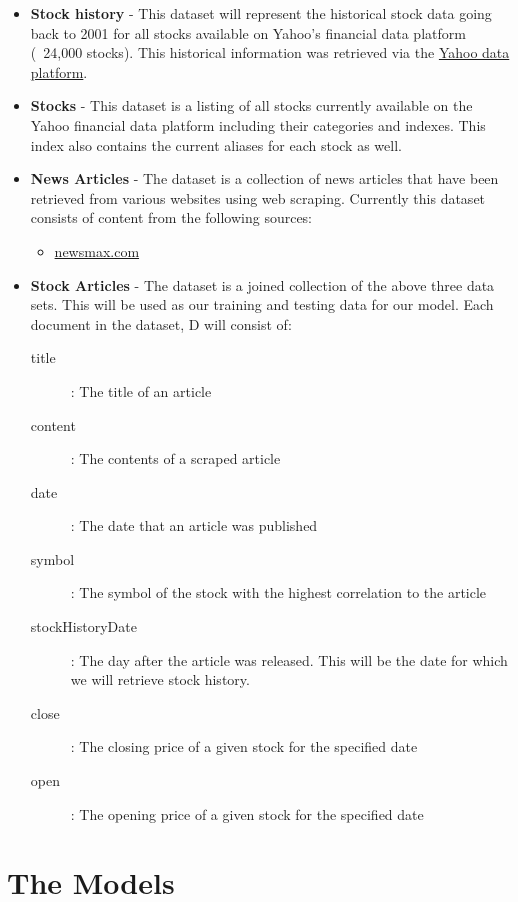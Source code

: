 \documentclass[11pt,letterpaper]{article}
\begin{document}
\begin{itemize}
  \item \textbf{Stock history}
  - This dataset will represent the historical stock data going back to 2001
    for all stocks available on Yahoo's financial data
    platform (~24,000 stocks). This historical information was
    retrieved via the \href{https://developer.yahoo.com/yql}{Yahoo data platform}.
\item \textbf{Stocks}
  - This dataset is a listing of all stocks currently available on the
    Yahoo financial data platform including their categories and indexes.
    This index also contains the current aliases for each stock as well.
\item \textbf{News Articles}
  - The dataset is a collection of news articles that have been retrieved
    from various websites using web scraping. Currently this dataset
    consists of content from the following sources:
  \begin{itemize}
    \item \href{http://www.newsmax.com/archives/}{newsmax.com}
  \end{itemize}
\item \textbf{Stock Articles}
  - The dataset is a joined collection of the above three data sets.
    This will be used as our training and testing data for our model.
    Each document in the dataset, D will consist of:
  \begin{description}
    \item[title] : The title of an article
    \item[content] : The contents of a scraped article
    \item[date] : The date that an article was published
    \item[symbol] : The symbol of the stock with the highest correlation to the article
    \item[stockHistoryDate] : The day after the article was released. This
      will be the date for which we will retrieve stock history.
    \item[close] : The closing price of a given stock for the specified date
    \item[open] : The opening price of a given stock for the specified date
  \end{description}
\end{itemize}

\section{The Models}
\label{sec:models}
\end{document}
